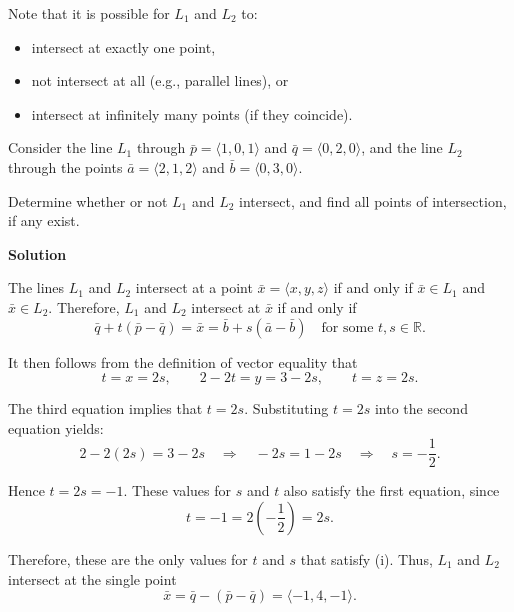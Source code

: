 Note that it is possible for \(L_1\) and \(L_2\) to:
\begin{itemize}
  \item intersect at exactly one point,
  \item not intersect at all (e.g., parallel lines), or
  \item intersect at infinitely many points (if they coincide).
\end{itemize}
\begin{examplebox}
Consider the line \(L_1\) through \(\bar{p} = \langle 1, 0, 1 \rangle\) and \(\bar{q} = \langle 0, 2, 0 \rangle\), and the line \(L_2\) through the points \(\bar{a} = \langle 2, 1, 2 \rangle\) and \(\bar{b} = \langle 0, 3, 0 \rangle\). 

Determine whether or not \(L_1\) and \(L_2\) intersect, and find all points of intersection, if any exist.

\vspace{1em}

\textbf{Solution}

\vspace{1em}

The lines \(L_1\) and \(L_2\) intersect at a point \(\bar{x} = \langle x, y, z \rangle\) if and only if \(\bar{x} \in L_1\) and \(\bar{x} \in L_2\). Therefore, \(L_1\) and \(L_2\) intersect at \(\bar{x}\) if and only if
\[
\bar{q} + t(\bar{p} - \bar{q}) = \bar{x} = \bar{b} + s(\bar{a} - \bar{b}) \quad \text{for some } t, s \in \mathbb{R}. \tag{i}
\]

It then follows from the definition of vector equality that
\[
t = x = 2s, \qquad 2 - 2t = y = 3 - 2s, \qquad t = z = 2s.
\]

The third equation implies that \(t = 2s\). Substituting \(t = 2s\) into the second equation yields:
\[
2 - 2(2s) = 3 - 2s \quad \Rightarrow \quad -2s = 1 - 2s \quad \Rightarrow \quad s = -\frac{1}{2}.
\]

Hence \(t = 2s = -1\). These values for \(s\) and \(t\) also satisfy the first equation, since
\[
t = -1 = 2\left(-\frac{1}{2}\right) = 2s.
\]

Therefore, these are the only values for \(t\) and \(s\) that satisfy (i). Thus, \(L_1\) and \(L_2\) intersect at the single point
\[
\bar{x} = \bar{q} - (\bar{p} - \bar{q}) = \langle -1, 4, -1 \rangle.
\]
\end{examplebox}

